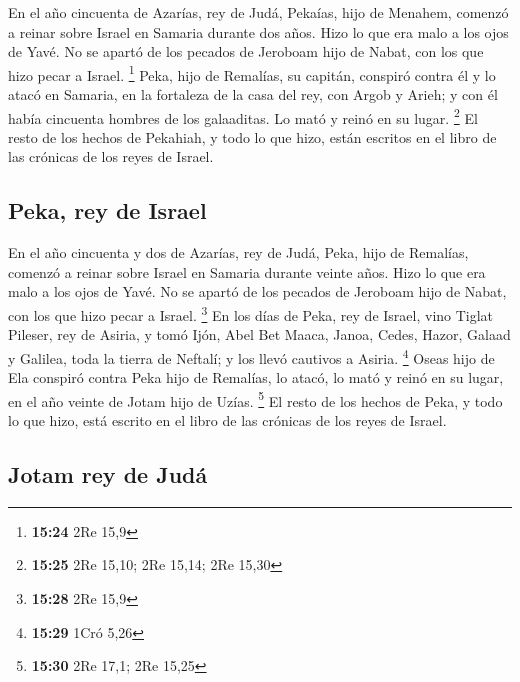 \begin{paracol}{2}
 En el año cincuenta de Azarías, rey de Judá, Pekaías,
hijo de Menahem, comenzó a reinar sobre Israel en Samaria durante dos
años.  Hizo lo que era malo a los ojos de Yavé. No se
apartó de los pecados de Jeroboam hijo de Nabat, con los que hizo pecar
a Israel. \footnote{\textbf{15:24} 2Re 15,9}  Peka, hijo
de Remalías, su capitán, conspiró contra él y lo atacó en Samaria, en la
fortaleza de la casa del rey, con Argob y Arieh; y con él había
cincuenta hombres de los galaaditas. Lo mató y reinó en su lugar.
\footnote{\textbf{15:25} 2Re 15,10; 2Re 15,14; 2Re 15,30}
 El resto de los hechos de Pekahiah, y todo lo que hizo,
están escritos en el libro de las crónicas de los reyes de Israel.

\hypertarget{peka-rey-de-israel}{%
\subsection{Peka, rey de Israel}\label{peka-rey-de-israel}}

 En el año cincuenta y dos de Azarías, rey de Judá, Peka,
hijo de Remalías, comenzó a reinar sobre Israel en Samaria durante
veinte años.  Hizo lo que era malo a los ojos de Yavé. No
se apartó de los pecados de Jeroboam hijo de Nabat, con los que hizo
pecar a Israel. \footnote{\textbf{15:28} 2Re 15,9}  En
los días de Peka, rey de Israel, vino Tiglat Pileser, rey de Asiria, y
tomó Ijón, Abel Bet Maaca, Janoa, Cedes, Hazor, Galaad y Galilea, toda
la tierra de Neftalí; y los llevó cautivos a Asiria. \footnote{\textbf{15:29}
  1Cró 5,26}  Oseas hijo de Ela conspiró contra Peka hijo
de Remalías, lo atacó, lo mató y reinó en su lugar, en el año veinte de
Jotam hijo de Uzías. \footnote{\textbf{15:30} 2Re 17,1; 2Re 15,25}
 El resto de los hechos de Peka, y todo lo que hizo, está
escrito en el libro de las crónicas de los reyes de Israel.

\hypertarget{jotam-rey-de-juduxe1}{%
\subsection{Jotam rey de Judá}\label{jotam-rey-de-juduxe1}}


\end{paracol}
